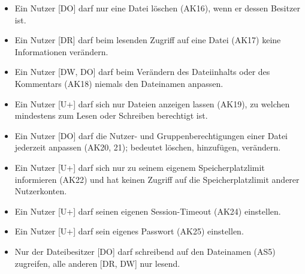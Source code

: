 \documentclass[fontsize=12pt,DIV=14,BCOR=10mm,a4paper,parskip=half-,headsepline,headinclude,english,ngerman,bibliography=totocnumbered]{scrreprt}
\begin{document}
\begin{itemize}
  \item Ein Nutzer [DO] darf nur eine Datei löschen (AK16), wenn er dessen Besitzer ist.
  \item Ein Nutzer [DR] darf beim lesenden Zugriff auf eine Datei (AK17) keine Informationen verändern.
  \item Ein Nutzer [DW, DO] darf beim Verändern des Dateiinhalts oder des Kommentars (AK18) niemals den Dateinamen anpassen.
  \item Ein Nutzer [U+] darf sich nur Dateien anzeigen lassen (AK19), zu welchen mindestens zum Lesen oder Schreiben berechtigt ist.
  \item Ein Nutzer [DO] darf die Nutzer- und Gruppenberechtigungen einer Datei jederzeit anpassen (AK20, 21); bedeutet löschen, hinzufügen, verändern.
  \item Ein Nutzer [U+] darf sich nur zu seinem eigenem Speicherplatzlimit informieren (AK22) und hat keinen Zugriff auf die Speicherplatzlimit anderer Nutzerkonten.
  \item Ein Nutzer [U+] darf seinen eigenen Session-Timeout (AK24) einstellen.
  \item Ein Nutzer [U+] darf sein eigenes Passwort (AK25) einstellen.
  \item Nur der Dateibesitzer [DO] darf schreibend auf den Dateinamen (AS5) zugreifen, alle anderen [DR, DW] nur lesend.
\end{itemize}

\printbibliography

\printacronyms[title=Abkürzungsverzeichnis,toctitle=Abkürzungsverzeichnis]
\printglossary[title=Glossar,toctitle=Glossar,type=main]

\iftotalfigures
  \listoffigures
\fi
\end{document}
